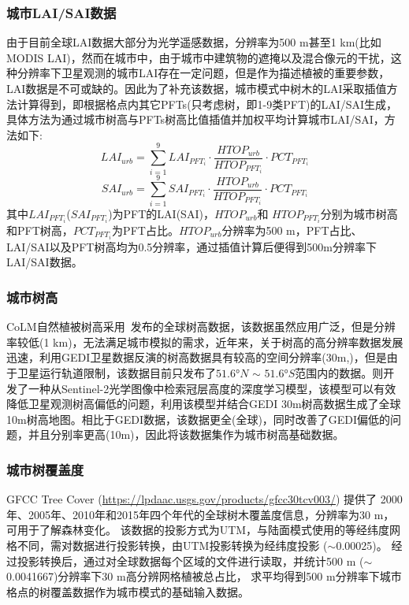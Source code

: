 \subsubsection{城市LAI/SAI数据}\label{城市LAISAI数据}
由于目前全球LAI数据大部分为光学遥感数据，分辨率为500 m甚至1 km(比如MODIS LAI)，然而在城市中，由于城市中建筑物的遮掩以及混合像元的干扰，这种分辨率下卫星观测的城市LAI存在一定问题，但是作为描述植被的重要参数，LAI数据是不可或缺的。因此为了补充该数据，城市模式中树木的LAI采取插值方法计算得到，即根据格点内其它PFTs(只考虑树，即1-9类PFT)的LAI/SAI生成，具体方法为通过城市树高与PFTs树高比值插值并加权平均计算城市LAI/SAI，方法如下:
\begin{equation}
LAI_{urb}=\sum_{i=1}^{9} LAI_{PFT_{i}} \cdot \frac{HTOP_{urb}}{HTOP_{PFT_{i}}} \cdot PCT_{PFT_{i}}
\end{equation}
\begin{equation}
SAI_{urb}=\sum_{i=1}^{9} SAI_{PFT_{i}} \cdot \frac{HTOP_{urb}}{HTOP_{PFT_{i}}} \cdot PCT_{PFT_{i}}
\end{equation}
其中$LAI_{PFT_{i}}$($SAI_{PFT_{i}}$)为PFT的LAI(SAI)，$HTOP_{urb}$和 $HTOP_{PFT_{i}}$分别为城市树高和PFT树高，$PCT_{PFT_{i}}$为PFT占比。$HTOP_{urb}$分辨率为500 m，PFT占比、LAI/SAI以及PFT树高均为0.5\textdegree{}分辨率，通过插值计算后便得到500m分辨率下LAI/SAI数据。

\subsubsection{城市树高}\label{城市树高数据}
CoLM自然植被树高采用~\citet{simard2011mapping}发布的全球树高数据，该数据虽然应用广泛，但是分辨率较低(1 km)，无法满足城市模拟的需求，近年来，关于树高的高分辨率数据发展迅速，\citet{potapov2021mapping}利用GEDI卫星数据反演的树高数据具有较高的空间分辨率(30m,)，但是由于卫星运行轨道限制，该数据目前只发布了$51.6°N$ $\sim$ $51.6°S$范围内的数据。\citet{lang2023high}则开发了一种从Sentinel-2光学图像中检索冠层高度的深度学习模型，该模型可以有效降低卫星观测树高偏低的问题，\citet{lang2023high}利用该模型并结合GEDI 30m树高数据生成了全球10m树高地图。相比于GEDI数据，该数据更全(全球)，同时改善了GEDI偏低的问题，并且分别率更高(10m)，因此将该数据集作为城市树高基础数据。

\subsubsection{城市树覆盖度}
GFCC Tree Cover (\url{https://lpdaac.usgs.gov/products/gfcc30tcv003/}) 提供了
2000年、2005年、2010年和2015年四个年代的全球树木覆盖度信息，分辨率为30 m，可用于了解森林变化。
该数据的投影方式为UTM，与陆面模式使用的等经纬度网格不同，需对数据进行投影转换，由UTM投影转换为经纬度投影 ($\sim$0.00025\textdegree)。
经过投影转换后，通过对全球数据每个区域的文件进行读取，并统计500 m 
 ($\sim$0.0041667\textdegree)分辨率下30 m高分辨网格植被总占比，
求平均得到500 m分辨率下城市格点的树覆盖数据作为城市模式的基础输入数据。

